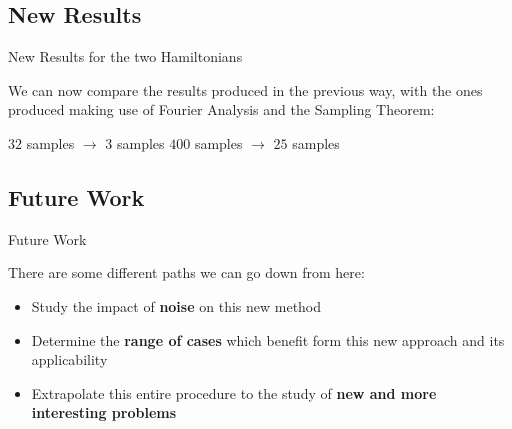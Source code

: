 \documentclass[9pt, handout, aspectratio=169]{beamer}		%
\begin{document}

	\subsection{New Results}

	\begin{frame}{New Results for the two Hamiltonians}

		We can now compare the results produced in the previous way, with the ones produced making use of Fourier Analysis and the Sampling Theorem:

		\begin{multicols}{2}
			$32$ samples $\rightarrow$ $3$ samples
			\columnbreak
			$400$ samples $\rightarrow$ $25$ samples
		\end{multicols}

	\end{frame}


	\subsection{Future Work}

	\begin{frame}{Future Work}

		There are some different paths we can go down from here:

		\begin{itemize}
			\item Study the impact of \textbf{noise} on this new method
			\item Determine the \textbf{range of cases} which benefit form this new approach and its applicability
			\item Extrapolate this entire procedure to the study of \textbf{new and more interesting problems}
		\end{itemize}

	\end{frame}

\end{document}
